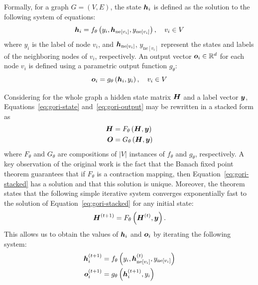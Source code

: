 Formally, for a graph \( G = (V, E) \), the state \( \bm{h}_i \) is defined as the solution to the following system of equations:
\begin{equation}\label{eq:gori-state}
	\bm{h}_i = f_\theta \left( y_i, \bm{h}_{\mathrm{ne}[v_i]}, y_{\mathrm{ne}[v_i]} \right) , \quad v_i \in V
\end{equation}
where \( y_i \) is the label of node \( v_i \), and \( \bm{h}_{\mathrm{ne}[v_i]} \), \( y_{\mathrm{ne}[v_i]} \) represent the states and labels of the neighboring nodes of \( v_i \), respectively. An output vector \( \bm{o}_i \in \mathbb{R}^d \) for each node \( v_i \) is defined using a parametric output function \( g_\theta \):
\begin{equation}\label{eq:gori-output}
	\bm{o}_i = g_\theta \left( \bm{h}_i, y_i \right) , \quad v_i \in V
\end{equation}

Considering for the whole graph a hidden state matrix \( \bm{H} \) and a label vector \( \bm{y} \), Equations~\ref{eq:gori-state} and~\ref{eq:gori-output} may be rewritten in a stacked form as
\begin{equation}\label{eq:gori-stacked}
	\begin{split}
		\bm{H} &= F_\theta \left( \bm{H}, \bm{y} \right) \\
		\bm{O} &= G_\theta \left( \bm{H}, \bm{y} \right)
	\end{split}
\end{equation}
where \( F_\theta \) and \( G_\theta \) are compositions of \( \left\lvert V \right\rvert \) instances of \( f_\theta \) and \( g_\theta \), respectively. A key observation of the original work is the fact that the Banach fixed point theorem guarantees that if \( F_\theta \) is a contraction mapping, then Equation~\ref{eq:gori-stacked} has a solution and that this solution is unique. Moreover, the theorem states that the following simple iterative system converges exponentially fast to the solution of Equation~\ref{eq:gori-stacked} for any initial state:
\begin{equation}
	\bm{H}^{(t+1)} = F_\theta \left( \bm{H}^{(t)}, \bm{y} \right).
\end{equation}
This allows us to obtain the values of \( \bm{h}_i \) and \( \bm{o}_i \) by iterating the following system:
\begin{equation}\label{eq:gori-iterative}
	\begin{split}
		\bm{h}_i^{(t+1)} &= f_\theta \left( y_i, \bm{h}_{\mathrm{ne}[v_i]}^{(t)}, y_{\mathrm{ne}[v_i]} \right) \\
		\bm{o}_i^{(t+1)} &= g_\theta \left( \bm{h}_i^{(t+1)}, y_i \right)
	\end{split}
\end{equation}

